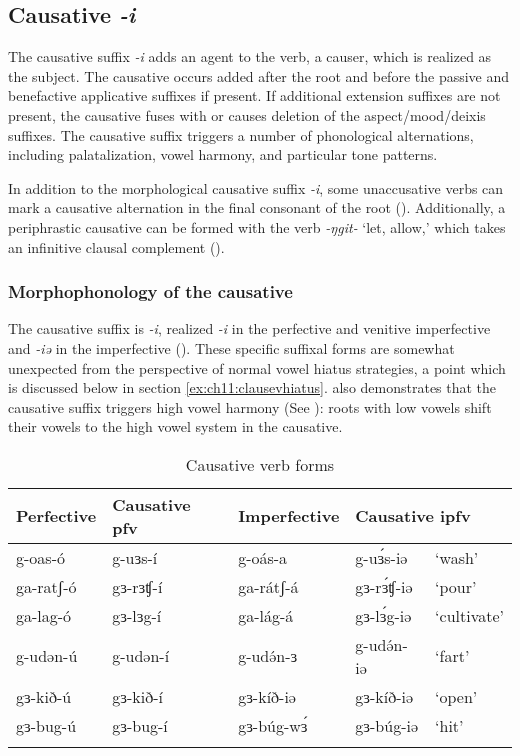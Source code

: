 \subsection{Causative \textit{-i}}\label{sec:ch11:causative}

The causative suffix \textit{-i} adds an agent to the verb, a causer, which is realized as the subject. The causative occurs added after the root and before the passive and benefactive applicative suffixes if present. If additional extension suffixes are not present, the causative fuses with or causes deletion of the aspect/mood/deixis suffixes. The causative suffix triggers a number of phonological alternations, including palatalization, vowel harmony, and particular tone patterns. 

In addition to the morphological causative suffix \textit{-i}, some unaccusative verbs can mark a causative alternation in the final consonant of the root (). Additionally, a periphrastic causative can be formed with the verb \textit{-ŋgit-} `let, allow,' which takes an infinitive clausal complement (). 

\subsubsection{Morphophonology of the causative}\label{sec:ch11:causpalatal}

The causative suffix is \textit{-i}, realized \textit{-i} in the perfective and venitive imperfective and \textit{-iə} in the imperfective (). These specific suffixal forms are somewhat unexpected from the perspective of normal vowel hiatus strategies, a point which is discussed below in section \ref{ex:ch11:clausevhiatus}.  also demonstrates that the causative suffix triggers high vowel harmony (See ): roots with low vowels shift their vowels to the high vowel system in the causative.

\begin{table}
\begin{tabular}[t]{lllll}
\lsptoprule
Perfective	& Causative pfv 	& Imperfective & \multicolumn{2}{l}{Causative ipfv} 	 \\
\midrule
g-oas-ó			& 	g-uɜs-í 		& g-oás-a		& 	g-uɜ́s-iə 	& ‘wash’	\\
ga-ratʃ-ó		&	gɜ-rɜʧ-í 		& ga-rátʃ-á		&	gɜ-rɜ́ʧ-iə 	& ‘pour’\\ 
ga-lag-ó		&	gɜ-lɜg-í 		& ga-lág-á		&	gɜ-lɜ́g-iə 	& ‘cultivate’\\ 
g-udən-ú		& 	g-udən-í 		&	g-udə́n-ɜ		&	g-udə́n-iə	& ‘fart’\\
gɜ-kið-ú		&	gɜ-kið-í		&	gɜ-kíð-iə	&	gɜ-kíð-iə	&	‘open’\\
gɜ-bug-ú		&	gɜ-bug-í		&	gɜ-búg-wɜ́	&	gɜ-búg-iə	&	‘hit’\\
\lspbottomrule
\end{tabular}
\caption{Causative verb forms} \label{tab:ch11:caus}    
\end{table}  

